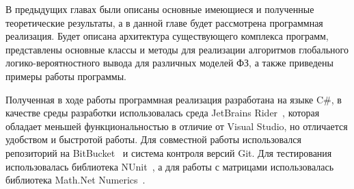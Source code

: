В предыдущих главах были описаны основные имеющиеся и полученные теоретические результаты, а в данной главе будет рассмотрена программная реализация. Будет описана архитектура существующего комплекса программ, представлены основные классы и методы для реализации алгоритмов глобального логико-вероятностного вывода для различных моделей ФЗ, а также приведены примеры работы программы.

Полученная в ходе работы программная реализация разработана на языке C\#, в качестве среды разработки использовалась среда JetBrains Rider~\cite{68}, которая обладает меньшей функциональностью в отличие от Visual Studio, но отличается удобством и быстротой работы. Для совместной работы использовался репозиторий на BitBucket~\cite{111} и система контроля версий Git. Для тестирования использовалась библиотека NUnit~\cite{67}, а для работы с матрицами использовалась библиотека Math.Net Numerics~\cite{66}.